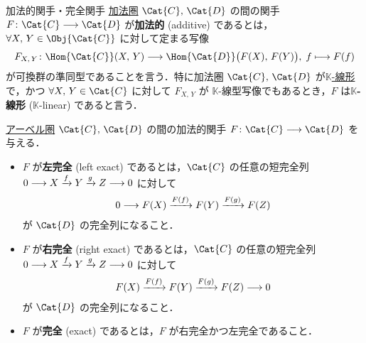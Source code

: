 \documentclass[TQFT_main]{subfiles}
\begin{document}

    \begin{mydef}[label=def:additive-exact]{加法的関手・完全関手}
        \hyperref[def:additive-cat]{加法圏} $\Cat{C},\, \Cat{D}$ の間の関手 $F \colon \Cat{C} \lto \Cat{D}$ が\textbf{加法的} (additive) であるとは，
        $\forall X,\, Y \in \Obj{\Cat{C}}$ に対して定まる写像
        \begin{align}
            F_{X,\, Y} \colon \Hom{\Cat{C}}(X,\, Y) \lto \Hom{\Cat{D}} \bigl( F(X),\, F(Y) \bigr),\; f \lmto F(f)
        \end{align}
        が可換群の準同型であることを言う．特に加法圏 $\Cat{C},\, \Cat{D}$ が\hyperref[def:additive-cat]{$\mathbb{K}$-線形}で，かつ $\forall X,\, Y \in \Cat{C}$ に対して $F_{X,\, Y}$ が $\mathbb{K}$-線型写像でもあるとき，$F$ は\textbf{$\mathbb{K}$-線形} ($\mathbb{K}$-linear) であると言う．

        \tcblower

        \hyperref[def:additive-cat]{アーベル圏} $\Cat{C},\, \Cat{D}$ の間の加法的関手 $F \colon \Cat{C} \lto \Cat{D}$ を与える．
        \begin{itemize}
            \item $F$ が\textbf{左完全} (left exact) であるとは，$\Cat{C}$ の任意の短完全列 $0 \longrightarrow X \xrightarrow{f} Y \xrightarrow{g} Z \longrightarrow 0$ に対して
            \begin{align}
                0 \longrightarrow F(X) \xrightarrow{F(f)} F(Y) \xrightarrow{F(g)} F(Z)
            \end{align}
            が $\Cat{D}$ の完全列になること．
            \item $F$ が\textbf{右完全} (right exact) であるとは，$\Cat{C}$ の任意の短完全列 $0 \longrightarrow X \xrightarrow{f} Y \xrightarrow{g} Z \longrightarrow 0$ に対して
            \begin{align}
                F(X) \xrightarrow{F(f)} F(Y) \xrightarrow{F(g)} F(Z) \longrightarrow 0
            \end{align}
            が $\Cat{D}$ の完全列になること．
            \item $F$ が\textbf{完全} (exact) であるとは，$F$ が右完全かつ左完全であること．
        \end{itemize}
        
    \end{mydef}
\end{document}
